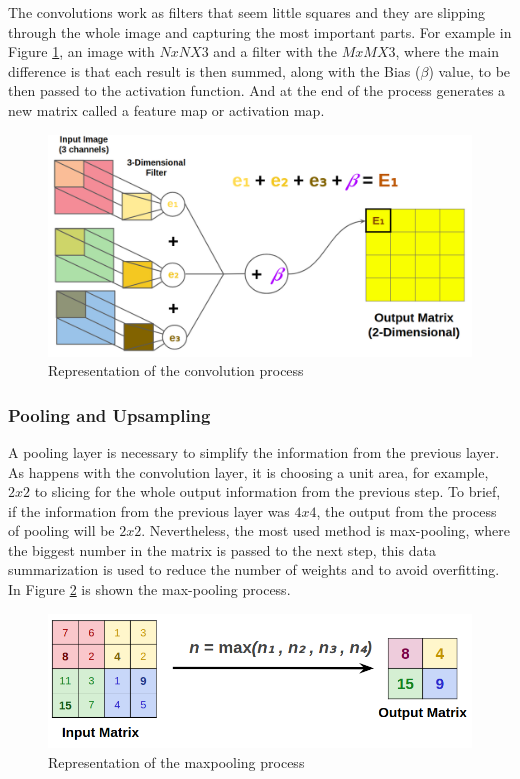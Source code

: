 The convolutions work as filters that seem little squares and they are slipping through the whole image and capturing the most important parts. For example in Figure \ref{fig:bias}, an image with $NxNX3$ and a filter with the $MxMX3$, where the main difference is that each result is then summed, along with the Bias ($\beta$) value, to be then passed to the activation function. And at the end of the process generates a new matrix called a feature map or activation map.


\begin{figure}[H]
\centering
\includegraphics[scale=0.35]{imagens/three_dim_conv_2.png}
\caption{Representation of the convolution process}
\label{fig:bias}
\end{figure}




\subsubsection{Pooling and Upsampling}\label{sub:pooling}

A pooling layer is necessary to simplify the information from the previous layer. As happens with the convolution layer, it is choosing a unit area, for example, $2x2$ to slicing for the whole output information from the previous step. To brief, if the information from the previous layer was $4x4$, the output from the process of pooling will be $2x2$. Nevertheless, the most used method is max-pooling, where the biggest number in the matrix is passed to the next step, this data summarization is used to reduce the number of weights and to avoid overfitting. In Figure \ref{fig:pooling} is shown the max-pooling process.

\begin{figure}[H]
\centering
\includegraphics[scale=0.35]{imagens/max_pooling.png}
\caption{Representation of the maxpooling process}
\label{fig:pooling}
\end{figure}




